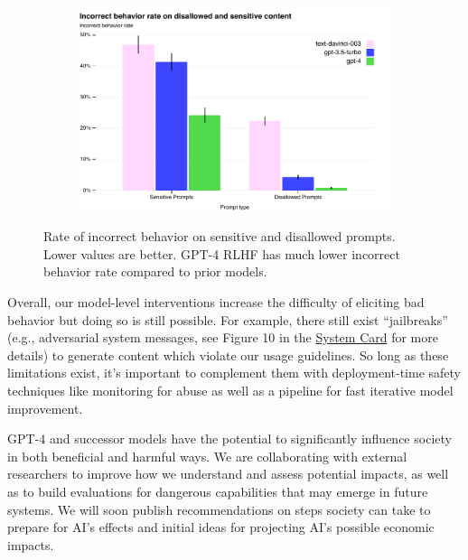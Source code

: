 \begin{figure}
    \centering
    \begin{subfigure}{\linewidth}
      \centering
      \includegraphics[width=0.8\linewidth]{assets/safety_headline_stats_incorrect_rate_qced}
      \label{fig:safety_headline_stats}
    \end{subfigure}\hspace{5mm} %
    \caption{ Rate of incorrect behavior on sensitive and disallowed prompts. Lower values are better. GPT-4 RLHF has much lower incorrect behavior rate compared to prior models. 
    }
    \label{fig:safety_plots}
\end{figure}


Overall, our model-level interventions increase the difficulty of eliciting bad behavior but doing so is still possible. For example, there still exist ``jailbreaks'' (e.g., adversarial system messages, see Figure 10 in the \hyperref[systemcard]{System Card} for more details) to generate content which violate our usage guidelines. So long as these limitations exist, it's important to complement them with deployment-time safety techniques like monitoring for abuse as well as a pipeline for fast iterative model improvement.

GPT-4 and successor models have the potential to significantly influence society in both beneficial and harmful ways. We are collaborating with external researchers to improve how we understand and assess potential impacts, as well as to build evaluations for dangerous capabilities that may emerge in future systems. We will soon publish recommendations on steps society can take to prepare for AI's effects and initial ideas for projecting AI's possible economic impacts.







